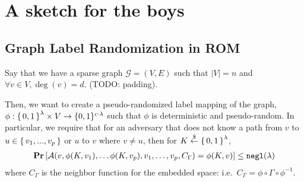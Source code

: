 \section{A sketch for the boys}
\newcommand{\graph}{\mathcal{G}}
\newcommand{\verts}{V}
\newcommand{\inner}{\texttt{inner}}
\newcommand{\edges}{E}
\newcommand{\maxDeg}{d}
\newcommand{\nVerts}{n}
\newcommand{\embedFn}{\phi}
\newcommand{\idealEmbedFn}{\Phi}
\newcommand{\circNeigb}{C_\Gamma}
\newcommand{\PRF}{\texttt{PRF}}
\newcommand{\Hyb}{\texttt{Hyb}}
\newcommand{\adversB}{\mathcal{B}}

\newcommand{\minEntropy}{I_\texttt{min}}

\subsection{Graph Label Randomization in ROM}
Say that we have a sparse graph $\graph = (\verts, \edges)$ such that $|\verts| = n$
and $\forall v \in \verts, \deg(v) = d$. (TODO: padding).

Then, we want to create a pseudo-randomized label mapping of the graph, $\embedFn: \set{0, 1}^\lambda \times \verts \rightarrow \{0, 1\}^{c \cdot \lambda}$
such that $\embedFn$ is deterministic and pseudo-random. In particular, we require that for an adversary 
that does not know a path from $v$ to $u \in \set{v_1, ..., v_p}$ or $u$ to $v$ where $v \neq u$, then for $K \overset{\$}{\gets} \set{0, 1}^\lambda$,
\begin{align}
	\Pr\left[\advers(v, \embedFn(K, v_1), \dots \embedFn(K, v_{p}), v_1, \dots, v_p, \circNeigb) = \embedFn(K, v)\right]
	\leq \negl(\lambda) 
	\label{eq:gameGRO}
\end{align}
where $\circNeigb$ is the neighbor function for the embedded space: i.e.\ $\circNeigb = \embedFn \circ \Gamma \circ \embedFn^{-1}$.

